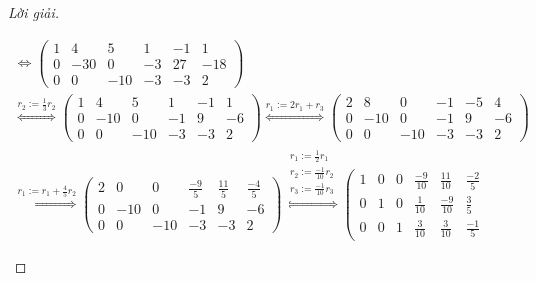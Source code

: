 \documentclass[class=nhvh-linear-algebra,crop=false]{standalone}
\begin{document}
\begin{proof}[Lời giải]
\begin{enumerate}[label = (\alph*)]
\begin{gather*}
{			      }{\Longleftrightarrow}
			      \left(\begin{array}{ccc|ccc}
					      1 & 4   & 5   & 1  & -1 & 1   \\
					      0 & -30 & 0   & -3 & 27 & -18 \\
					      0 & 0   & -10 & -3 & -3 & 2
				      \end{array}
			      \right) \\
			      \stackrel{
			      r_{2}:= \frac{1}{3}r_{2}
			      }{\Longleftrightarrow}
			      \left(\begin{array}{ccc|ccc}
					      1 & 4   & 5   & 1  & -1 & 1  \\
					      0 & -10 & 0   & -1 & 9  & -6 \\
					      0 & 0   & -10 & -3 & -3 & 2
				      \end{array}
			      \right)
			      \stackrel{
				      r_{1}:= 2r_{1} + r_{3}
			      }{\Longleftrightarrow}
			      \left(\begin{array}{ccc|ccc}
					      2 & 8   & 0   & -1 & -5 & 4  \\
					      0 & -10 & 0   & -1 & 9  & -6 \\
					      0 & 0   & -10 & -3 & -3 & 2
				      \end{array}
			      \right) \\
			      \stackrel{
			      r_{1}:= r_{1} + \frac{4}{5}r_{2}
			      }{\Longleftrightarrow}
			      \left(\begin{array}{ccc|ccc}
					      2 & 0   & 0   & \frac{-9}{5} & \frac{11}{5} & \frac{-4}{5} \\
					      0 & -10 & 0   & -1           & 9            & -6           \\
					      0 & 0   & -10 & -3           & -3           & 2
				      \end{array}
			      \right)
			      \stackrel{
			      \substack{
			      r_{1}:= \frac{1}{2}r_{1} \\
			      r_{2}:= \frac{-1}{10}r_{2} \\
			      r_{3}:= \frac{-1}{10}r_{3}
			      }
			      }{\Longleftrightarrow}
			      \left(\begin{array}{ccc|ccc}
					      1 & 0 & 0 & \frac{-9}{10} & \frac{11}{10} & \frac{-2}{5} \\
					      0 & 1 & 0 & \frac{1}{10}  & \frac{-9}{10} & \frac{3}{5}  \\
					      0 & 0 & 1 & \frac{3}{10}  & \frac{3}{10}  & \frac{-1}{5}
				      \end{array}

\end{gather*}
\end{enumerate}
\end{proof}
\end{document}

